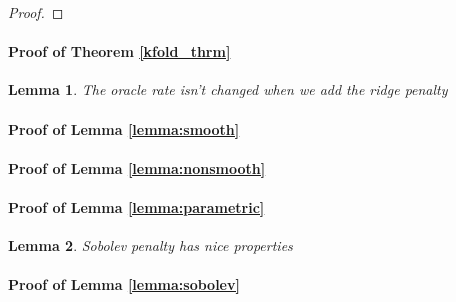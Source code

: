 \documentclass[12pt]{article}
\newtheorem{lemma}{Lemma}
\begin{document}
\begin{proof}
%
%
%
%
%
%
\end{proof}



\paragraph{Proof of Theorem \ref{kfold_thrm}}

\begin{lemma}
\label{oracle_maintained}
The oracle rate isn't changed when we add the ridge penalty
\end{lemma}

\paragraph{Proof of Lemma \ref{lemma:smooth}}
\paragraph{Proof of Lemma \ref{lemma:nonsmooth}}

\paragraph{Proof of Lemma \ref{lemma:parametric}}

\begin{lemma}
\label{lemma:sobolev_prop}
Sobolev penalty has nice properties
\end{lemma}

\paragraph{Proof of Lemma \ref{lemma:sobolev}}

\bigskip



\end{document}
